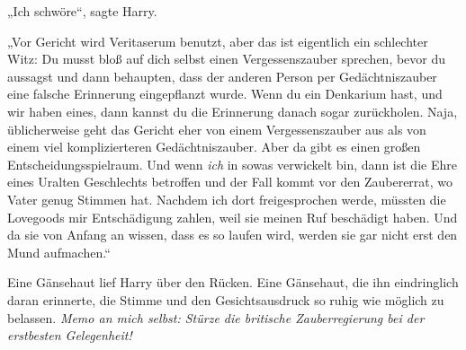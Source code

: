 




„Ich schwöre“, sagte Harry.

„Vor Gericht wird Veritaserum benutzt, aber das ist eigentlich ein schlechter Witz: Du musst bloß auf dich selbst einen Vergessenszauber sprechen, bevor du aussagst und dann behaupten, dass der anderen Person per Gedächtniszauber eine falsche Erinnerung eingepflanzt wurde. Wenn du ein Denkarium hast, und wir haben eines, dann kannst du die Erinnerung danach sogar zurückholen. Naja, üblicherweise geht das Gericht eher von einem Vergessenszauber aus als von einem viel komplizierteren Gedächtniszauber. Aber da gibt es einen großen Entscheidungsspielraum. Und wenn \emph{ich} in sowas verwickelt bin, dann ist die Ehre eines Uralten Geschlechts betroffen und der Fall kommt vor den Zaubererrat, wo Vater genug Stimmen hat. Nachdem ich dort freigesprochen werde, müssten die Lovegoods mir Entschädigung zahlen, weil sie meinen Ruf beschädigt haben. Und da sie von Anfang an wissen, dass es so laufen wird, werden sie gar nicht erst den Mund aufmachen.“

Eine Gänsehaut lief Harry über den Rücken. Eine Gänsehaut, die ihn eindringlich daran erinnerte, die Stimme und den Gesichtsausdruck so ruhig wie möglich zu belassen. \emph{Memo an mich selbst: Stürze die britische Zauberregierung bei der erstbesten Gelegenheit!}

